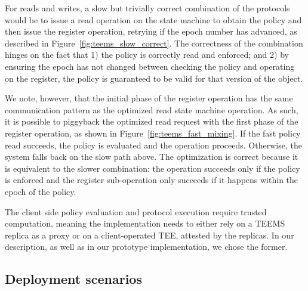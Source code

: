 


For reads and writes, a slow but trivially correct combination of
the protocols would be to issue a read operation on the state
machine to obtain the policy and then issue the register
operation, retrying if the epoch number has advanced, as described in Figure~\ref{fig:teems_slow_correct}.
The correctness of the combination hinges on the fact that 1) the
policy is correctly read and enforced; and 2) by ensuring the epoch
has not changed between checking the policy and operating on the
register, the policy is guaranteed to be valid for that version of the
object.


We note, however, that the initial phase of the register operation has
the same communication pattern as the optimized read state machine
operation. As such, it is possible to piggyback the optimized read
request with the first phase of the register operation, as shown in
Figure~\ref{fig:teems_fast_mixing}. If the fast policy read succeeds,
the policy is evaluated and the operation proceeds.  Otherwise, the
system falls back on the slow path above. The optimization is correct
because it is equivalent to the slower combination: the operation
succeeds only if the policy is enforced and the register sub-operation
only succeeds if it happens within the epoch of the policy.

The client side policy evaluation and protocol execution require
trusted computation, meaning the implementation needs to either
rely on a \ac{TEEMS} replica as a proxy or on a client-operated \ac{TEE},
attested by the replicas. In our description, as well as in our
prototype implementation, we chose the former.

\subsection{Deployment scenarios}

